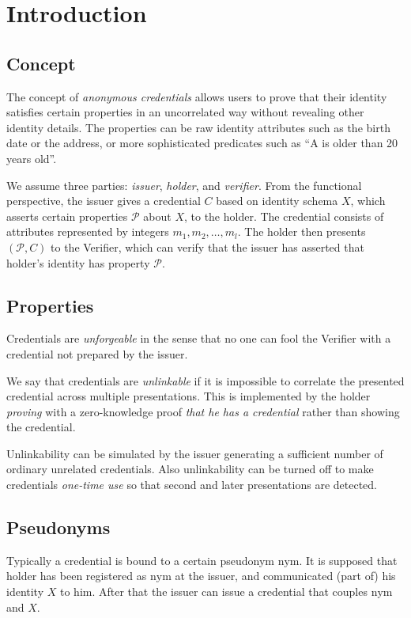 \section{Introduction}\label{sec:intro}
\subsection{Concept}

The concept of \emph{anonymous credentials} allows users to prove that their identity satisfies certain properties in an uncorrelated way without revealing other identity details.  The properties can be raw identity attributes  such as
the birth date or the address, or more sophisticated predicates such as ``A is older than 20 years old''.

We assume three parties: \emph{issuer}, \emph{holder}, and \emph{verifier}. From the functional perspective, the issuer gives a credential $C$ based on identity schema $X$, which asserts certain properties $\mathcal{P}$ about $X$, to the holder. The credential consists of attributes represented by integers $m_1, m_2,\ldots, m_l$. The holder then presents $(\mathcal{P},C)$  to the Verifier, which can verify that the issuer has asserted that holder's identity has property $\mathcal{P}$. 

\subsection{Properties}

Credentials are \emph{unforgeable} in the sense that no one can fool the Verifier with a credential not prepared by the issuer.

We say that credentials are  \emph{unlinkable} if it is impossible to correlate the presented credential across multiple presentations. This is implemented by the holder \emph{proving} with a zero-knowledge proof \emph{that he has a credential} rather than showing the credential.

Unlinkability can be simulated by the issuer generating a sufficient number of ordinary unrelated credentials. Also unlinkability can be turned off to make credentials \emph{one-time use} so that second and later presentations are detected.


\subsection{Pseudonyms}
Typically a credential is bound to a certain pseudonym $\mathrm{nym}$. It is supposed that holder has been registered as $\mathrm{nym}$ at the issuer, and communicated (part of) his identity $X$ to him. After  that the issuer can issue a credential that couples $\mathrm{nym}$ and $X$. 

